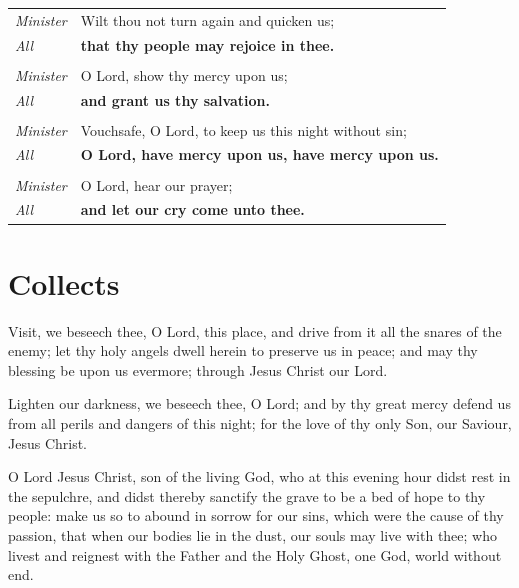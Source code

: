\documentclass[10pt]{article}
\begin{document}
\begin{tabularx}{\linewidth}{lX}

    \textit{Minister} & Wilt thou not turn again and quicken us; \\
    \textit{All} & \textbf{that thy people may rejoice in thee.} \\
    & \\
    \textit{Minister} & O Lord, show thy mercy upon us; \\
    \textit{All} & \textbf{and grant us thy salvation.} \\
    & \\
    \textit{Minister} & Vouchsafe, O Lord, to keep us this night without sin; \\
    \textit{All} & \textbf{O Lord, have mercy upon us, have mercy upon us.} \\
    & \\
    \textit{Minister} & O Lord, hear our prayer; \\
    \textit{All} & \textbf{and let our cry come unto thee.}

\end{tabularx}

\section*{Collects}


Visit, we beseech thee, O Lord, this place,
and drive from it all the snares of the enemy;
let thy holy angels dwell herein to preserve us in peace;
and may thy blessing be upon us evermore;
through Jesus Christ our Lord.


Lighten our darkness, we beseech thee, O Lord;
and by thy great mercy defend us
from all perils and dangers of this night;
for the love of thy only Son, our Saviour, Jesus Christ.


O Lord Jesus Christ, son of the living God,
who at this evening hour didst rest in the sepulchre,
and didst thereby sanctify the grave
to be a bed of hope to thy people:
make us so to abound in sorrow for our sins,
which were the cause of thy passion,
that when our bodies lie in the dust,
our souls may live with thee;
who livest and reignest with the Father and the Holy Ghost,
one God, world without end.

\end{document}
